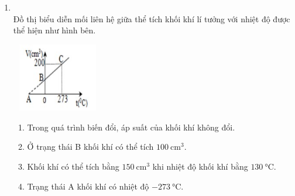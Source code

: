 \begin{enumerate}[label=\bfseries Câu \arabic*:, leftmargin=1.7cm]
\item {}\\
Đồ thị biểu diễn mối liên hệ giữa thể tích khối khí lí tưởng với nhiệt độ được thể hiện như hình bên.
\begin{center}
	\includegraphics[width=4cm, height=3cm]{../figs/VN12-Y24-PH-SYL-014P-16}
\end{center}
\begin{enumerate}[label=\alph*)]
	\item Trong quá trình biến đổi, áp suất của khối khí không đổi.
	\item Ở trạng thái B khối khí có thể tích $\SI{100}{\centi\meter^3}$.
	\item Khối khí có thể tích bằng $\SI{150}{\centi\meter^3}$ khi nhiệt độ khối khí bằng $\SI{130}{\celsius}$.
	\item Trạng thái A khối khí có nhiệt độ $\SI{-273}{\celsius}$.
\end{enumerate}


\end{enumerate}
